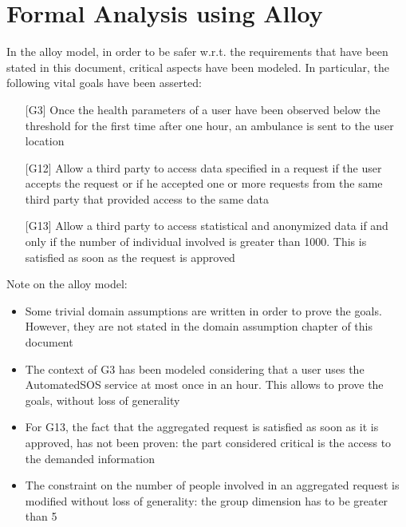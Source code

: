 \section{Formal Analysis using Alloy}
In the alloy model, in order to be safer w.r.t. the requirements that have been stated in this document, critical aspects have been modeled. 
In particular, the following vital goals have been asserted:
\begin{enumerate}
\item[{[G3]}] Once the health parameters of a user have been observed below the threshold for the first time after one hour, an ambulance is sent to the user location
\item[{[G12]}]  Allow a third party to access data specified in a request if the user accepts the request or if he accepted one or more requests from the same third party that provided access to the same data 
\item[{[G13]}] Allow a third party to access statistical and anonymized data if and only if the number of individual involved is greater than 1000. This is satisfied as soon as the request is approved  
\end{enumerate}

Note on the alloy model: 
\begin{itemize}
\item Some trivial domain assumptions are written in order to prove the goals. 
However, they are not stated in the domain assumption chapter of this document 
\item The context of G3 has been modeled considering that a user uses the AutomatedSOS service at most once in an hour. 
This allows to prove the goals, without loss of generality 
\item For G13, the fact that the aggregated request is satisfied as soon as it is approved, has not been proven: the part considered critical is the access to the demanded information 
\item The constraint on the number of people involved in an aggregated request is modified without loss of generality: the group dimension has to be greater than 5 
\end{itemize}



